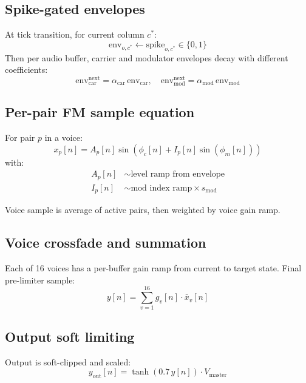 \documentclass[11pt,a4paper]{article}
\begin{document}
\subsection{Spike-gated envelopes}
At tick transition, for current column $c^*$:
\begin{equation}
\mathrm{env}_{o,c^*} \leftarrow \mathrm{spike}_{o,c^*} \in \{0,1\}
\end{equation}
Then per audio buffer, carrier and modulator envelopes decay with different coefficients:
\begin{equation}
\mathrm{env}^{\mathrm{next}}_{\mathrm{car}} = \alpha_{\mathrm{car}}\,\mathrm{env}_{\mathrm{car}},
\quad
\mathrm{env}^{\mathrm{next}}_{\mathrm{mod}} = \alpha_{\mathrm{mod}}\,\mathrm{env}_{\mathrm{mod}}
\end{equation}

\subsection{Per-pair FM sample equation}
For pair $p$ in a voice:
\begin{equation}
x_p[n] = A_p[n] \sin\left(\phi_c[n] + I_p[n]\sin(\phi_m[n])\right)
\end{equation}
with:
\begin{align}
A_p[n] &\sim \text{level ramp from envelope} \\
I_p[n] &\sim \text{mod index ramp} \times s_{\mathrm{mod}}
\end{align}

Voice sample is average of active pairs, then weighted by voice gain ramp.

\subsection{Voice crossfade and summation}
Each of 16 voices has a per-buffer gain ramp from current to target state. Final pre-limiter sample:
\begin{equation}
y[n] = \sum_{v=1}^{16} g_v[n] \cdot \bar{x}_v[n]
\end{equation}

\subsection{Output soft limiting}
Output is soft-clipped and scaled:
\begin{equation}
y_{\mathrm{out}}[n] = \tanh(0.7\,y[n])\cdot V_{\mathrm{master}}
\end{equation}
\end{document}
